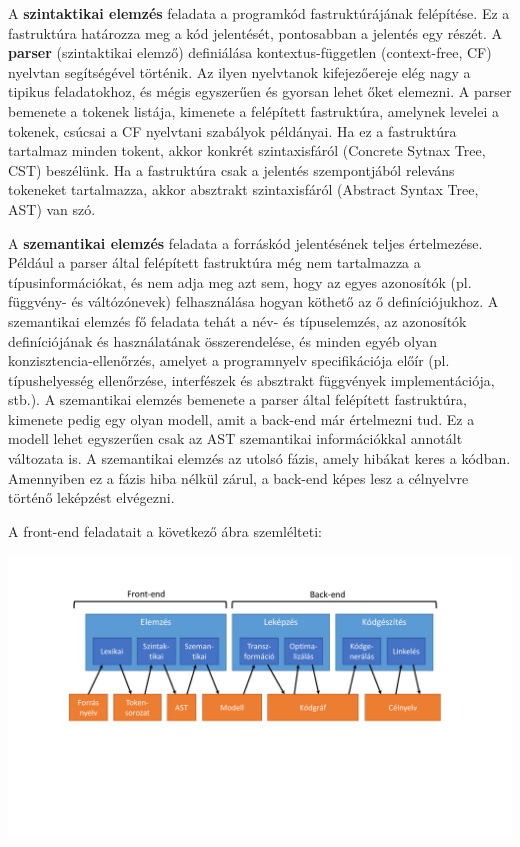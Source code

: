 \documentclass[12pt, a4paper]{report}
\newcommand{\bb}[1]{\textbf{#1}}
\begin{document}
A \bb{szintaktikai elemzés} feladata a programkód fastruktúrájának felépítése. Ez a fastruktúra határozza meg a kód jelentését, pontosabban a jelentés egy részét. A \bb{parser} (szintaktikai elemző) definiálása kontextus-független (context-free, CF) nyelvtan segítségével történik. Az ilyen nyelvtanok kifejezőereje elég nagy a tipikus feladatokhoz, és mégis egyszerűen és gyorsan lehet őket elemezni. A parser bemenete a tokenek listája, kimenete a felépített fastruktúra, amelynek levelei a tokenek, csúcsai a CF nyelvtani szabályok példányai. Ha ez a fastruktúra tartalmaz minden tokent, akkor konkrét szintaxisfáról (Concrete Sytnax Tree, CST) beszélünk. Ha a fastruktúra csak a jelentés szempontjából releváns tokeneket tartalmazza, akkor absztrakt szintaxisfáról (Abstract Syntax Tree, AST) van szó.

A \bb{szemantikai elemzés} feladata a forráskód jelentésének teljes értelmezése. Például a parser által felépített fastruktúra még nem tartalmazza a típusinformációkat, és nem adja meg azt sem, hogy az egyes azonosítók (pl. függvény- és váltózónevek) felhasználása hogyan köthető az ő definíciójukhoz. A szemantikai elemzés fő feladata tehát a név- és típuselemzés, az azonosítók definíciójának és használatának összerendelése, és minden egyéb olyan konzisztencia-ellenőrzés, amelyet a programnyelv specifikációja előír (pl. típushelyesség ellenőrzése, interfészek és absztrakt függvények implementációja, stb.). A szemantikai elemzés bemenete a parser által felépített fastruktúra, kimenete pedig egy olyan modell, amit a back-end már értelmezni tud. Ez a modell lehet egyszerűen csak az AST szemantikai információkkal annotált változata is. A szemantikai elemzés az utolsó fázis, amely hibákat keres a kódban. Amennyiben ez a fázis hiba nélkül zárul, a back-end képes lesz a célnyelvre történő leképzést elvégezni.

A front-end feladatait a következő ábra szemlélteti:

\begin{center}\includegraphics[trim=120 120 120 110,clip,width=\textwidth,page=2]{Images.pdf}\end{center}
\end{document}

